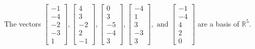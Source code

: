 \begin{exercise}
\begin{exerciseStatement}
  \end{exerciseStatement}
  \begin{exerciseAnswer}
   The vectors \(\left[\begin{array}{r}
-1 \\
-4 \\
-2 \\
-3 \\
1
\end{array}\right] , \left[\begin{array}{r}
4 \\
3 \\
-2 \\
2 \\
-1
\end{array}\right] , \left[\begin{array}{r}
0 \\
3 \\
-5 \\
-4 \\
3
\end{array}\right] , \left[\begin{array}{r}
-4 \\
1 \\
3 \\
-3 \\
3
\end{array}\right] , \text{ and } \left[\begin{array}{r}
-1 \\
-4 \\
4 \\
2 \\
0
\end{array}\right]\) 
  	 are  a basis of \(\mathbb{R}^5\).
  


  \end{exerciseAnswer}
\end{exercise}